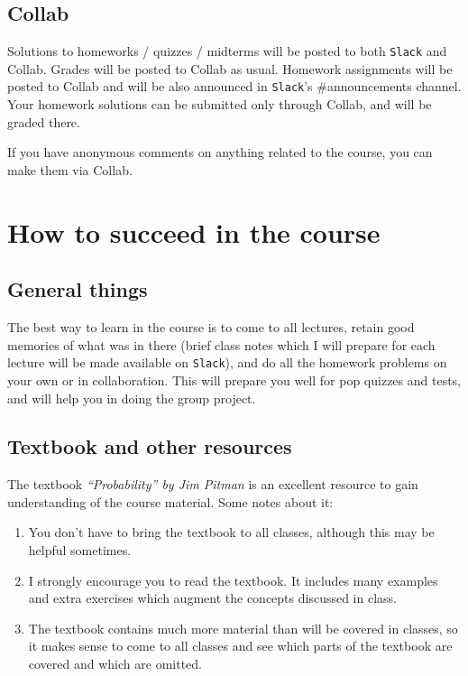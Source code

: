 \documentclass[oneside,11pt]{amsart}
\begin{document}
\subsection{Collab}

Solutions to homeworks / quizzes / midterms will be posted to both
\texttt{Slack} and Collab.  Grades will be posted to Collab as usual.  Homework
assignments will be posted to Collab and will be also announced in
\texttt{Slack}'s \#announcements channel. 
Your homework solutions can be submitted only through Collab, and will be graded there.

If you have anonymous comments on anything related to the course, you can make
them via Collab.

\section{How to succeed in the course}
\label{success}

\subsection{General things}

The best way to learn in the course is to 
come to all lectures, retain good memories 
of what was in there
(brief class notes which I will prepare for each lecture 
will be made available on \texttt{Slack}),
and do all the homework problems on your own or in collaboration.
This will prepare you well for pop quizzes and tests, and will help you in 
doing the group project.

\subsection{Textbook and other resources}

The textbook \emph{``Probability'' by Jim Pitman} is an excellent resource 
to gain understanding of the course material. Some notes about it:

\begin{enumerate}[$\bullet$]
	\item You don't have to bring the textbook to all classes, 
		although this may be helpful sometimes. 
	\item I strongly encourage you to read the textbook. It includes many examples and
		extra exercises which augment the concepts discussed in class. 
	\item The textbook contains much more material than will be covered in classes, so it
		makes sense to come to all classes and see which parts of the textbook
		are covered and which are omitted.
\end{enumerate}
\end{document}
